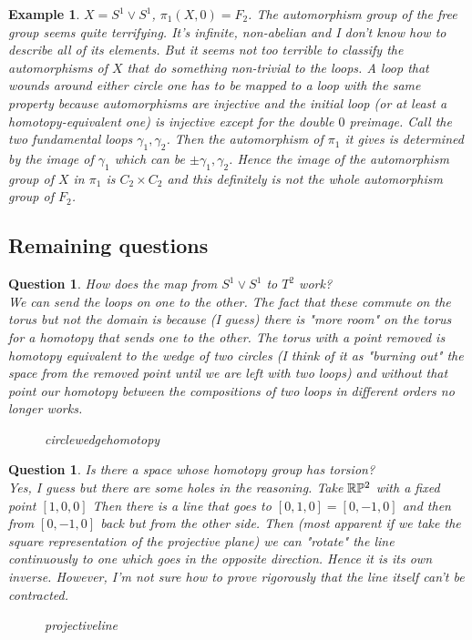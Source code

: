 \documentclass[a4paper]{article}
\newtheorem{exmp}[thm]{Example}
\newtheorem{que}[thm]{Question}
\begin{document}
\begin{exmp}$X=S^{1}\vee S^{1}$, $\pi_1(X,0)=F_2$.
    The automorphism group of the free group seems quite terrifying. It's infinite, non-abelian and I don't know how to describe all of its elements. But it seems not too terrible to classify the automorphisms of $X$ that do something non-trivial to the loops. A loop that wounds around either circle one has to be mapped to a loop with the same property because automorphisms are injective and the initial loop (or at least a homotopy-equivalent one) is injective except for the double $0$ preimage. Call the two fundamental loops $\gamma_1,\gamma_2$. Then the automorphism of $\pi_1$ it gives is determined by the image of $\gamma_1$ which can be $\pm\gamma_1,\gamma_2$. Hence the image of the automorphism group of $X$ in $\pi_1$ is $C_2\times C_2$ and this definitely is not the whole automorphism group of $F_2$.
    
\end{exmp}
\subsection*{Remaining questions}
\begin{que}
    How does the map from $S^{1}\vee S^{1}$ to $T^{2}$ work?\\
    We can send the loops on one to the other. The fact that these commute on the torus but not the domain is because (I guess) there is "more room" on the torus for a homotopy that sends one to the other. The torus with a point removed is homotopy equivalent to the wedge of two circles (I think of it as "burning out" the space from the removed point until we are left with two loops) and without that point our homotopy between the compositions of two loops in different orders no longer works.  
\begin{figure}[ht]
    \centering
    \caption{circlewedgehomotopy}
    \label{fig:circlewedgehomotopy}
\end{figure}
\end{que}
\begin{que}
    Is there a space whose homotopy group has torsion?\\
    Yes, I guess but there are some holes in the reasoning. Take $\mathbb{R}\mathbb{P}^2$ with a fixed point $\left[ 1,0,0 \right] $ Then there is a line that goes to $[0,1,0]=[0,-1,0]$ and then from $[0,-1,0]$ back but from the other side. Then (most apparent if we take the square representation of the projective plane) we can "rotate" the line continuously to one which goes in the opposite direction. Hence it is its own inverse. However, I'm not sure how to prove rigorously that the line itself can't be contracted.  
\begin{figure}[ht]
    \centering
    \caption{projectiveline}
    \label{fig:projectiveline}
\end{figure}
    
\end{que}
\end{document}
